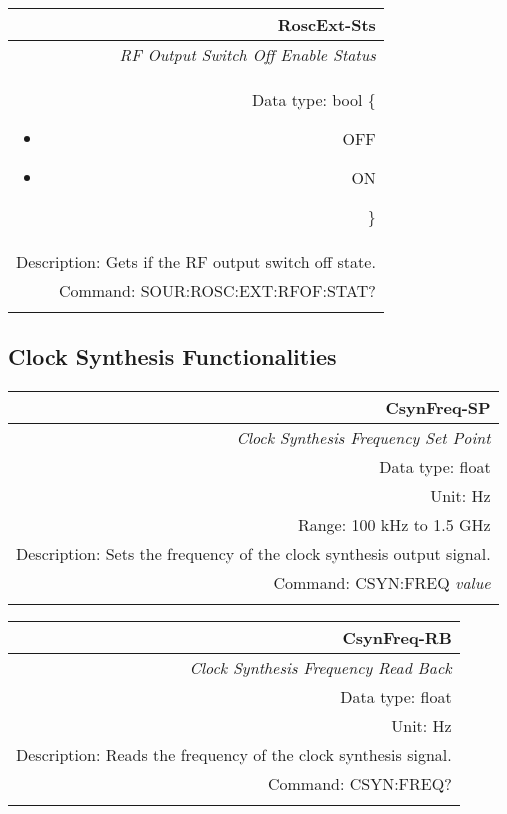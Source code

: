 \documentclass[openany]{article}
\begin{document}
		\begin{tabular}{N}
			\hline
			\bfseries RoscExt-Sts \\ \hline
			\emph{RF Output Switch Off Enable Status} \\
			Data type: bool \{\begin{itemize}[noitemsep]
				\small
				\item[] OFF
				\item[] ON
			\end{itemize}\} \\
			Description: Gets if the RF output switch off state. \\
			Command: SOUR:ROSC:EXT:RFOF:STAT? \\
			\\
			
		\end{tabular}


	\subsection{Clock Synthesis Functionalities}\label{pvgroup:function} %

		\paragraph{} %

		\begin{tabular}{N}
			\hline
			\bfseries CsynFreq-SP \\ \hline
			\emph{Clock Synthesis Frequency Set Point} \\
			Data type: float \\
			Unit: Hz \\
			Range: 100 kHz to 1.5 GHz \\
			Description: Sets the frequency of the clock synthesis output signal. \\
			Command: CSYN:FREQ \emph{value} \\
			\\

		\end{tabular}


		\begin{tabular}{N}
			\hline
			\bfseries CsynFreq-RB \\ \hline
			\emph{Clock Synthesis Frequency Read Back} \\
			Data type: float \\
			Unit: Hz \\
			Description: Reads the frequency of the clock synthesis signal. \\
			Command: CSYN:FREQ? \\
			\\

		\end{tabular}
\end{document}
